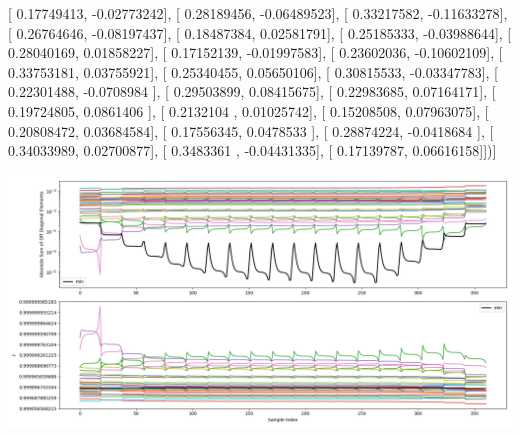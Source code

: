 \documentclass{article}
\begin{document}
       [ 0.17749413, -0.02773242],
       [ 0.28189456, -0.06489523],
       [ 0.33217582, -0.11633278],
       [ 0.26764646, -0.08197437],
       [ 0.18487384,  0.02581791],
       [ 0.25185333, -0.03988644],
       [ 0.28040169,  0.01858227],
       [ 0.17152139, -0.01997583],
       [ 0.23602036, -0.10602109],
       [ 0.33753181,  0.03755921],
       [ 0.25340455,  0.05650106],
       [ 0.30815533, -0.03347783],
       [ 0.22301488, -0.0708984 ],
       [ 0.29503899,  0.08415675],
       [ 0.22983685,  0.07164171],
       [ 0.19724805,  0.0861406 ],
       [ 0.2132104 ,  0.01025742],
       [ 0.15208508,  0.07963075],
       [ 0.20808472,  0.03684584],
       [ 0.17556345,  0.0478533 ],
       [ 0.28874224, -0.0418684 ],
       [ 0.34033989,  0.02700877],
       [ 0.3483361 , -0.04431335],
       [ 0.17139787,  0.06616158]])]
\begin{center}
\includegraphics[scale=.9]{report_pickled_controls245/control_dpn_all.png}

\end{center}
\end{document}
